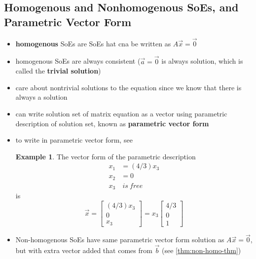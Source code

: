 \documentclass[a4paper,12pt]{article}
\theoremstyle{definition}
\theoremstyle{definition}
\newtheorem{example}{Example}[subsection]
\begin{document}
	\subsection{Homogenous and Nonhomogenous SoEs, and Parametric Vector Form}
	\begin{itemize}
		\item \textbf{homogenous} SoEs are SoEs hat cna be written as $A\vec{x} = \vec{0}$
		
		\item homogenous SoEs are always consistent ($\vec{a} = \vec{0}$ is always solution, which is called the \textbf{trivial solution})
		
		\item care about nontrivial solutions to the equation since we know that there is always a solution
		
		\item can write solution set of matrix equation as a vector using parametric description of solution set, known as \textbf{parametric vector form}
		
		\item to write in parametric vector form, see 
		
		\begin{example}
			The vector form of the parametric description
			\begin{align*}
				x_1 &= (4/3)x_3\\
				x_2 &= 0\\
				x_3 & \:is \:free
			\end{align*}
			is
			\begin{equation*}
				\vec{x} =
				\begin{bmatrix}
					(4/3)x_3\\
					0\\
					x_3
				\end{bmatrix}
				= x_3
				\begin{bmatrix}
					4/3\\
					0\\
					1
				\end{bmatrix}
			\end{equation*}
		\end{example}
		
		\item Non-homogenous SoEs have same parametric vector form solution as $A\vec{x} = \vec{0}$, but with extra vector added that comes from $\vec{b}$ (see \autoref{thm:non-homo-thm})
	\end{itemize}
	
\end{document}
